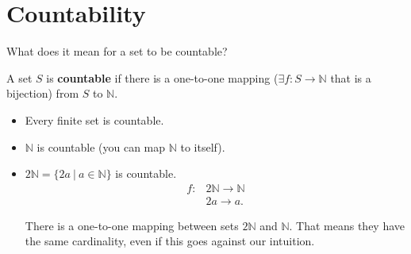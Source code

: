 \section{Countability}
What does it mean for a set to be countable?

\begin{definition}
	A set \( S \) is \textbf{countable} if there is a one-to-one mapping (\( \exists f \colon S \to \mathbb{N} \) that is a bijection) from \( S \) to \( \mathbb{N} \).
\end{definition}
\begin{itemize}
	\item Every finite set is countable.
	\item \( \mathbb{N} \) is countable (you can map \( \mathbb{N} \) to itself).
	\item \( 2 \mathbb{N} = \{2a ~|~ a \in  \mathbb{N}\}   \) is countable.
		\begin{align*}
			f \colon & 2 \mathbb{N} \to  \mathbb{N} \\
							 & 2a \to a
		.\end{align*}
		\begin{remark}
			There is a one-to-one mapping between sets \( 2\mathbb{N} \) and \( \mathbb{N} \). That means they have the same cardinality, even if this goes against our intuition.
		\end{remark}
\end{itemize}

